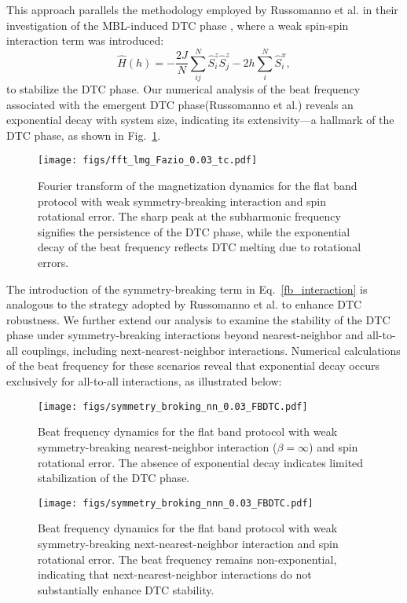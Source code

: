 \documentclass[a4paper,10pt]{article}
\begin{document}
This approach parallels the methodology employed by Russomanno et al. in their investigation of the MBL-induced DTC phase \cite{Russomanno2017}, where a weak spin-spin interaction term was introduced:
\begin{equation}
    \hat{H}(h) = -\frac{2J}{N}\sum_{ij}^N \hat{S}^z_i \hat{S}^z_j -2h\sum_i^N \hat{S}^x_i,
\end{equation}
to stabilize the DTC phase. Our numerical analysis of the beat frequency associated with the emergent DTC phase(Russomanno et al.) reveals an exponential decay with system size, indicating its extensivity—a hallmark of the DTC phase, as shown in Fig.~\ref{fig:fft_lmg_Fazio}.
\begin{figure}[h!]
    \centering
    \texttt{[image: figs/fft\_lmg\_Fazio\_0.03\_tc.pdf]}
    \caption{Fourier transform of the magnetization dynamics for the flat band protocol with weak symmetry-breaking interaction and spin rotational error. The sharp peak at the subharmonic frequency signifies the persistence of the DTC phase, while the exponential decay of the beat frequency reflects DTC melting due to rotational errors.}
    \label{fig:fft_lmg_Fazio}
\end{figure}

\noindent The introduction of the symmetry-breaking term in Eq.~\eqref{fb_interaction} is analogous to the strategy adopted by Russomanno et al. to enhance DTC robustness. We further extend our analysis to examine the stability of the DTC phase under symmetry-breaking interactions beyond nearest-neighbor and all-to-all couplings, including next-nearest-neighbor interactions. Numerical calculations of the beat frequency for these scenarios reveal that exponential decay occurs exclusively for all-to-all interactions, as illustrated below:
\vfill
\begin{figure}[h]
    \centering
    \begin{minipage}[t]{0.48\textwidth}
        \centering
        \texttt{[image: figs/symmetry\_broking\_nn\_0.03\_FBDTC.pdf]}
        \caption{Beat frequency dynamics for the flat band protocol with weak symmetry-breaking nearest-neighbor interaction ($\beta = \infty$) and spin rotational error. The absence of exponential decay indicates limited stabilization of the DTC phase.}
        \label{fig:symmetry_broking_nn}
    \end{minipage}
    \hfill
    \begin{minipage}[t]{0.48\textwidth}
        \centering
        \texttt{[image: figs/symmetry\_broking\_nnn\_0.03\_FBDTC.pdf]}
        \caption{Beat frequency dynamics for the flat band protocol with weak symmetry-breaking next-nearest-neighbor interaction and spin rotational error. The beat frequency remains non-exponential, indicating that next-nearest-neighbor interactions do not substantially enhance DTC stability.}
        \label{fig:symmetry_broking_nnn}
    \end{minipage}
\end{figure}
\end{document}
